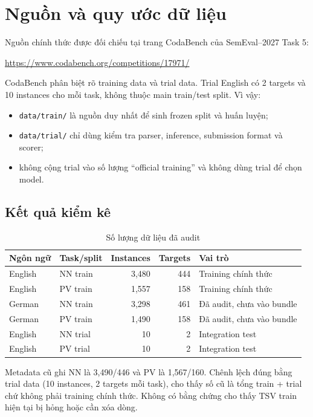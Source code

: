 \documentclass[11pt,a4paper]{article}
\newcommand{\code}[1]{\nolinkurl{#1}}
\begin{document}
\section{Nguồn và quy ước dữ liệu}

Nguồn chính thức được đối chiếu tại trang CodaBench của SemEval--2027 Task 5:
\begin{center}
\url{https://www.codabench.org/competitions/17971/}
\end{center}

CodaBench phân biệt rõ training data và trial data. Trial English có 2 targets và 10 instances cho mỗi task, không thuộc main train/test split. Vì vậy:
\begin{itemize}
  \item \code{data/train/} là nguồn duy nhất để sinh frozen split và huấn luyện;
  \item \code{data/trial/} chỉ dùng kiểm tra parser, inference, submission format và scorer;
  \item không cộng trial vào số lượng ``official training'' và không dùng trial để chọn model.
\end{itemize}

\subsection{Kết quả kiểm kê}

\begin{table}[htbp]
\centering
\caption{Số lượng dữ liệu đã audit}
\small
\begin{tabularx}{\textwidth}{@{}l l r r Y@{}}
\toprule
Ngôn ngữ & Task/split & Instances & Targets & Vai trò \\
\midrule
English & NN train  & 3,480 & 444 & Training chính thức \\
English & PV train  & 1,557 & 158 & Training chính thức \\
German  & NN train  & 3,298 & 461 & Đã audit, chưa vào bundle \\
German  & PV train  & 1,490 & 158 & Đã audit, chưa vào bundle \\
English & NN trial  & 10 & 2 & Integration test \\
English & PV trial  & 10 & 2 & Integration test \\
\bottomrule
\end{tabularx}
\end{table}

Metadata cũ ghi NN là 3,490/446 và PV là 1,567/160. Chênh lệch đúng bằng trial data (10 instances, 2 targets mỗi task), cho thấy số cũ là tổng train + trial chứ không phải training chính thức. Không có bằng chứng cho thấy TSV train hiện tại bị hỏng hoặc cần xóa dòng.
\end{document}
